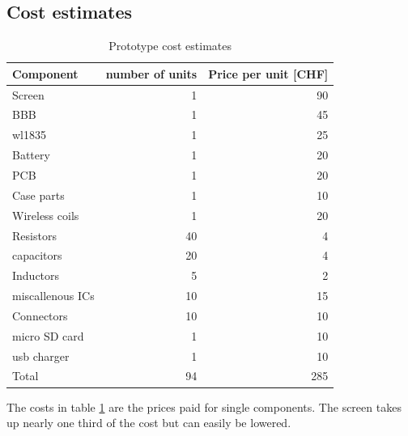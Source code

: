 \subsection{Cost estimates}
\begin{table}[!htbp]
  \begin{center}
    \begin{tabular}{|l|r|r|}%
      \hline
        Component & number of units & Price per unit [CHF] \\ \hline \hline
        Screen & 1 & 90 \\ \hline
        BBB & 1 &  45 \\ \hline
        wl1835 & 1 &  25 \\ \hline
        Battery & 1 & 20 \\ \hline
        PCB & 1 & 20 \\ \hline
        Case parts & 1 & 10 \\ \hline
        Wireless coils & 1 & 20  \\ \hline
        Resistors & 40 & 4 \\ \hline
        capacitors & 20 & 4 \\ \hline
        Inductors & 5 & 2 \\ \hline
        miscallenous ICs & 10 & 15 \\ \hline
        Connectors & 10 & 10 \\ \hline
        micro SD card & 1 & 10 \\ \hline
        usb charger & 1 & 10 \\ \hline \hline
        Total & 94 & 285\\ \hline

    \end{tabular}
  \end{center}
  \caption {Prototype cost estimates} \label{tab:cost estimates}
\end{table}

The costs in table \ref{tab:cost estimates} are the prices paid for single components. The screen takes up nearly one third of the cost but can easily be lowered.
